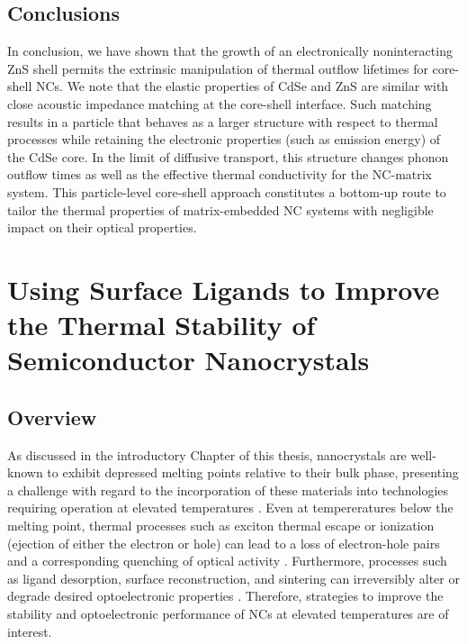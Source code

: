 \subsection{Conclusions}
In conclusion, we have shown that the growth of an electronically noninteracting ZnS shell permits the extrinsic manipulation of thermal outflow lifetimes for core-shell NCs. We note that the elastic properties of CdSe and ZnS are similar with close acoustic impedance matching at the core-shell interface. Such matching results in a particle that behaves as a larger structure with respect to thermal processes while retaining the electronic properties (such as emission energy) of the CdSe core. In the limit of diffusive transport, this structure changes phonon outflow times as well as the effective thermal conductivity for the NC-matrix system. This particle-level core-shell approach constitutes a bottom-up route to tailor the thermal properties of matrix-embedded NC systems with negligible impact on their optical properties.

\section{Using Surface Ligands to Improve the Thermal Stability of Semiconductor Nanocrystals}

\subsection{Overview}
As discussed in the introductory Chapter of this thesis, nanocrystals are well-known to exhibit depressed melting points relative to their bulk phase, presenting a challenge with regard to the incorporation of these materials into technologies requiring operation at elevated temperatures \cite{goldstein1992melting}. Even at tempereratures below the melting point, thermal processes such as exciton thermal escape or ionization (ejection of either the electron or hole) can lead to a loss of electron-hole pairs and a corresponding quenching of optical activity \cite{valerini2005temperature,yang1997effect, jones2009signatures}. Furthermore, processes such as ligand desorption, surface reconstruction, and sintering can irreversibly alter or degrade desired optoelectronic properties \cite{gao2004nanostructures}. Therefore, strategies to improve the stability and optoelectronic performance of NCs at elevated temperatures are of interest. \par

